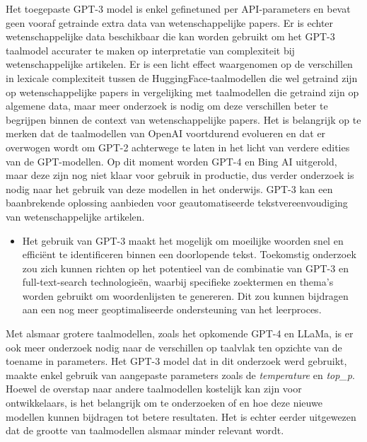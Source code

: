 Het toegepaste GPT-3 model is enkel gefinetuned per API-parameters en bevat geen vooraf getrainde extra data van wetenschappelijke papers. Er is echter wetenschappelijke data beschikbaar die kan worden gebruikt om het GPT-3 taalmodel accurater te maken op interpretatie van complexiteit bij wetenschappelijke artikelen. Er is een licht effect waargenomen op de verschillen in lexicale complexiteit tussen de HuggingFace-taalmodellen die wel getraind zijn op wetenschappelijke papers in vergelijking met taalmodellen die getraind zijn op algemene data, maar meer onderzoek is nodig om deze verschillen beter te begrijpen binnen de context van wetenschappelijke papers. Het is belangrijk op te merken dat de taalmodellen van OpenAI voortdurend evolueren en dat er overwogen wordt om GPT-2 achterwege te laten in het licht van verdere edities van de GPT-modellen. Op dit moment worden GPT-4 en Bing AI uitgerold, maar deze zijn nog niet klaar voor gebruik in productie, dus verder onderzoek is nodig naar het gebruik van deze modellen in het onderwijs. GPT-3 kan een baanbrekende oplossing aanbieden voor geautomatiseerde tekstvereenvoudiging van wetenschappelijke artikelen.

\begin{itemize}
	\item Het gebruik van GPT-3 maakt het mogelijk om moeilijke woorden snel en efficiënt te identificeren binnen een doorlopende tekst. Toekomstig onderzoek zou zich kunnen richten op het potentieel van de combinatie van GPT-3 en full-text-search technologieën, waarbij specifieke zoektermen en thema's worden gebruikt om woordenlijsten te genereren. Dit zou kunnen bijdragen aan een nog meer geoptimaliseerde ondersteuning van het leerproces.
\end{itemize}

Met alsmaar grotere taalmodellen, zoals het opkomende GPT-4 en LLaMa, is er ook meer onderzoek nodig naar de verschillen op taalvlak ten opzichte van de toename in parameters. Het GPT-3 model dat in dit onderzoek werd gebruikt, maakte enkel gebruik van aangepaste parameters zoals de \textit{temperature} en \textit{top\_p}. Hoewel de overstap naar andere taalmodellen kostelijk kan zijn voor ontwikkelaars, is het belangrijk om te onderzoeken of en hoe deze nieuwe modellen kunnen bijdragen tot betere resultaten. Het is echter eerder uitgewezen dat de grootte van taalmodellen alsmaar minder relevant wordt. 

